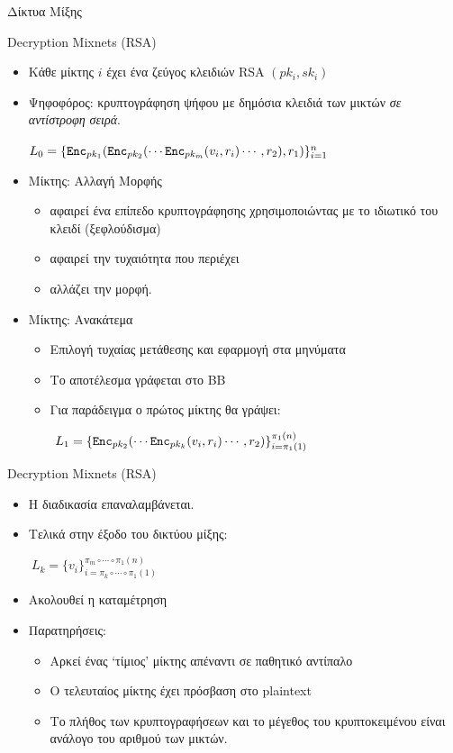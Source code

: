 \documentclass[handout]{beamer}
\begin{document}
\begin{section}{Δίκτυα Μίξης}
\begin{frame}{Decryption Mixnets (RSA)}
\begin{itemize}
    \item Κάθε μίκτης $i$ έχει ένα ζεύγος κλειδιών RSA $(pk_i, sk_i)$ \pause 
    \item Ψηφοφόρος: κρυπτογράφηση ψήφου με δημόσια κλειδιά των μικτών \textit{σε αντίστροφη σειρά}. 
        \begin{center}
        $L_0 = \{ \mathtt{Enc}_{pk_1}(\mathtt{Enc}_{pk_2}( \cdots \mathtt{Enc}_{pk_m}(v_i,r_i) \cdots, r_2), r_1) \}_{i=1}^n$
        \end{center}
    \item Μίκτης: Αλλαγή Μορφής \pause 
    \begin{itemize}
    \item αφαιρεί ένα επίπεδο κρυπτογράφησης χρησιμοποιώντας με το ιδιωτικό του κλειδί (ξεφλούδισμα)
    \item αφαιρεί την τυχαιότητα που περιέχει
    \item αλλάζει την μορφή.
    \end{itemize} \pause 
    \item Μίκτης: Ανακάτεμα \\ 
    \begin{itemize}
        \item Επιλογή τυχαίας μετάθεσης και εφαρμογή στα μηνύματα
        \item Το αποτέλεσμα γράφεται στο ΒΒ
        \item Για παράδειγμα ο πρώτος μίκτης θα γράψει:        
        \begin{center}
         $\ L_1 = \{ \mathtt{Enc}_{pk_2}( \cdots \mathtt{Enc}_{pk_k}(v_{i},r_{i}) \cdots, r_2) \}_{i=\pi_1(1)}^{\pi_1(n)} $
        \end{center}        
    \end{itemize} 
 \end{itemize}
 \end{frame}
 \begin{frame}{Decryption Mixnets (RSA)}
 \begin{itemize}
    \item Η διαδικασία επαναλαμβάνεται. \pause 
    \item Τελικά στην έξοδο  του δικτύου μίξης:
        \begin{center}
        $\ L_k = \{  v_{i} \}_{i=\pi_k \circ \cdots \circ \pi_1(1)}^{\pi_m \circ \cdots \circ \pi_1(n)} $
        \end{center} \pause 
    \item Ακολουθεί η καταμέτρηση 
    \item Παρατηρήσεις: \pause 
        \begin{itemize}
            \item Αρκεί ένας `τίμιος' μίκτης απέναντι σε παθητικό αντίπαλο
            \item Ο τελευταίος μίκτης έχει πρόσβαση στο plaintext
            \item Το πλήθος των κρυπτογραφήσεων και το μέγεθος του κρυπτοκειμένου είναι ανάλογο του αριθμού των μικτών.
        \end{itemize}
\end{itemize} 
\end{frame}


\end{section}
\end{document}

